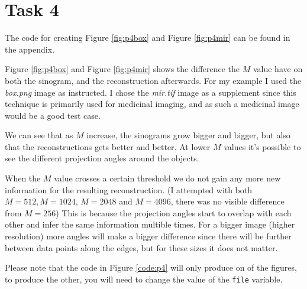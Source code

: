 \section{Task 4}
The code for creating Figure \ref{fig:p4box} and Figure \ref{fig:p4mir} can be found in the appendix.

Figure \ref{fig:p4box} and Figure \ref{fig:p4mir} shows the difference the $M$ value have on both
the sinogram, and the reconstruction afterwards. For my example I used the \textit{box.png} image as
instructed. I chose the \textit{mir.tif} image as a supplement since this technique is primarily
used for medicinal imaging, and as such a medicinal image would be a good test case.

We can see that as $M$ increase, the sinograms grow bigger and bigger, but also that the
reconstructions gets better and better. At lower $M$ values it's possible to see the different
projection angles around the objects.

When the $M$ value crosses a certain threshold we do not gain any more new information for the
resulting reconstruction. (I attempted with both $M=512, M=1024$, $M=2048$ and $M=4096$, there was no
visible difference from $M=256$) This is because the projection angles start to overlap with each
other and infer the same information multible times. For a bigger image (higher resolution) more
angles will make a bigger difference since there will be further between data points along the
edges, but for these sizes it does not matter.

Please note that the code in Figure \ref{code:p4} will only produce on of the figures, to produce
the other, you will need to change the value of the \texttt{file} variable.

\begin{landscape}
\centering
{}
\end{landscape}